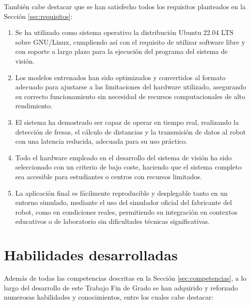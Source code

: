 También cabe destacar que se han satisfecho todos los requisitos planteados en la Sección \ref{sec:requisitos}:

\begin{enumerate}
    \item Se ha utilizado como sistema operativo la distribución Ubuntu 22.04 LTS sobre GNU/Linux, cumpliendo así con el requisito de utilizar software libre y con soporte a largo plazo para la ejecución del programa del sistema de visión.
    \item Los modelos entrenados han sido optimizados y convertidos al formato adecuado para ajustarse a las limitaciones del hardware utilizado, asegurando su correcto funcionamiento sin necesidad de recursos computacionales de alto rendimiento.
    \item El sistema ha demostrado ser capaz de operar en tiempo real, realizando la detección de fresas, el cálculo de distancias y la transmisión de datos al robot con una latencia reducida, adecuada para su uso práctico.
    \item Todo el hardware empleado en el desarrollo del sistema de visión ha sido seleccionado con un criterio de bajo coste, haciendo que el sistema completo sea accesible para estudiantes o centros con recursos limitados.
    \item La aplicación final es fácilmente reproducible y desplegable tanto en un entorno simulado, mediante el uso del simulador oficial del fabricante del robot, como en condiciones reales, permitiendo su integración en contextos educativos o de laboratorio sin dificultades técnicas significativas.
\end{enumerate}

\section{Habilidades desarrolladas}
\label{sec:habilidades_desarrolladas}

Además de todas las competencias descritas en la Sección \ref{sec:competencias}, a lo largo del desarrollo de este Trabajo Fin de Grado se han adquirido y reforzado numerosas habilidades y conocimientos, entre los cuales cabe destacar:


